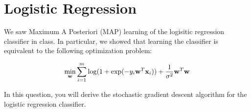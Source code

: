 \section{Logistic Regression}\label{sec:logistic-regression}

We saw Maximum A Posteriori (MAP) learning of the logisitic regression
classifier in class.  In particular, we showed that learning the classifier is
equivalent to the following optimization problem:

\begin{equation*}
    \min_{{\bf w}}\sum\limits_{i=1}^m \log(1+\exp(-y_i {\bf w}^{T}{\bf x}_i))+\frac{1}{\sigma^2}{\bf w}^T {\bf w}
\end{equation*}

In this question, you will derive the stochastic gradient descent algorithm for
the logistic regression classifier.

